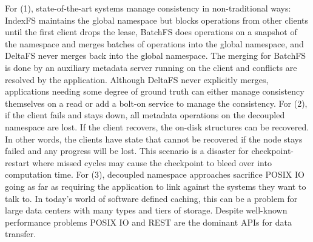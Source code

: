 For (1), state-of-the-art systems manage consistency in non-traditional ways:
IndexFS maintains the global namespace but blocks operations from other clients
until the first client drops the lease, BatchFS does operations on a snapshot
of the namespace and merges batches of operations into the global namespace,
and DeltaFS never merges back into the global namespace. The merging for
BatchFS is done by an auxiliary metadata server running on the client and
conflicts are resolved by the application. Although DeltaFS never explicitly
merges, applications needing some degree of ground truth can either manage
consistency themselves on a read or add a bolt-on service to manage the
consistency. For (2), if the client fails and stays down, all metadata
operations on the decoupled namespace are lost. If the client recovers, the
on-disk structures can be recovered. In other words, the clients have state that cannot
be recovered if the node stays failed and any progress will be lost. This
scenario is a disaster for checkpoint-restart where missed cycles may cause the
checkpoint to bleed over into computation time. For (3), decoupled namespace
approaches sacrifice POSIX IO going as far as requiring the application to link
against the systems they want to talk to. In today's world of software defined
caching, this can be a problem for large data centers with many types and tiers
of storage. Despite well-known performance problems POSIX IO and REST are the
dominant APIs for data transfer.
